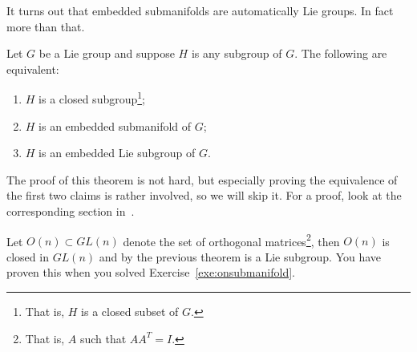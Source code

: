 It turns out that embedded submanifolds are automatically Lie groups. In fact more than that.

\begin{theorem}
	Let $G$ be a Lie group and suppose $H$ is any subgroup of $G$.
	The following are equivalent:
	\begin{enumerate}
		\item $H$ is a closed subgroup\footnote{That is, $H$ is a closed subset of $G$.};
		\item $H$ is an embedded submanifold of $G$;
		\item $H$ is an embedded Lie subgroup of $G$.
	\end{enumerate}
\end{theorem}

The proof of this theorem is not hard, but especially proving the equivalence of the first two claims is rather involved, so we will skip it.
For a proof, look at the corresponding section in~\cite[Chapter 20]{book:lee}.

\begin{example}
	Let $O(n)\subset GL(n)$ denote the set of orthogonal matrices\footnote{That is, $A$ such that $AA^T = I$.}, then $O(n)$ is closed in $GL(n)$ and by the previous theorem is a Lie subgroup.
	You have proven this when you solved Exercise~\ref{exe:onsubmanifold}.
\end{example}

